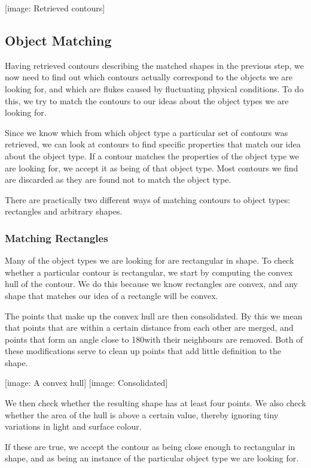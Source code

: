 \documentclass[10pt,twocolumn]{article}
\begin{document}
[image: Retrieved contours]

\subsection{Object Matching}
Having retrieved contours describing the matched shapes in the previous step, we now need to find out which contours actually correspond to the objects we are looking for, and which are flukes caused by fluctuating physical conditions. To do this, we try to match the contours to our ideas about the object types we are looking for.

Since we know which from which object type a particular set of contours was retrieved, we can look at contours to find specific properties that match our idea about the object type. If a contour matches the properties of the object type we are looking for, we accept it as being of that object type. Most contours we find are discarded as they are found not to match the object type.

There are practically two different ways of matching contours to object types: rectangles and arbitrary shapes.

\subsubsection{Matching Rectangles}
Many of the object types we are looking for are rectangular in shape. To check whether a particular contour is rectangular, we start by computing the convex hull of the contour. We do this because we know rectangles are convex, and any shape that matches our idea of a rectangle will be convex.

The points that make up the convex hull are then consolidated. By this we mean that points that are within a certain distance from each other are merged, and points that form an angle close to 180\degree with their neighbours are removed. Both of these modifications serve to clean up points that add little definition to the shape.

[image: A convex hull] [image: Consolidated]

We then check whether the resulting shape has at least four points. We also check whether the area of the hull is above a certain value, thereby ignoring tiny variations in light and surface colour.

If these are true, we accept the contour as being close enough to rectangular in shape, and as being an instance of the particular object type we are looking for. 
\end{document}

